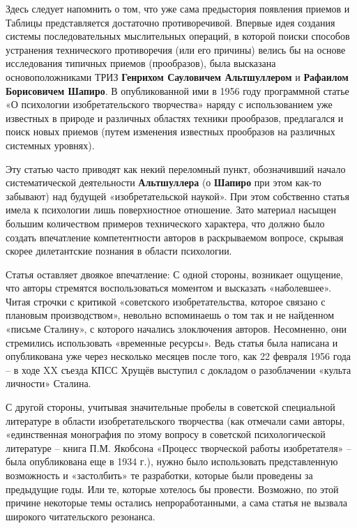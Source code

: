 \documentclass[11pt,a4paper]{article}
\begin{document}
Здесь следует напомнить о том, что уже сама предыстория появления приемов и
Таблицы представляется достаточно противоречивой. Впервые идея создания
системы последовательных мыслительных операций, в которой поиски способов
устранения технического противоречия (или его причины) велись бы на основе
исследования типичных приемов (прообразов), была высказана основоположниками
ТРИЗ \textbf{Генрихом Сауловичем Альтшуллером} и \textbf{Рафаилом Борисовичем
  Шапиро}. В опубликованной ими в 1956 году программной статье «О психологии
изобретательского творчества» \cite{Altshuller1956} наряду с использованием
уже известных в природе и различных областях техники прообразов, предлагался и
поиск новых приемов (путем изменения известных прообразов на различных
системных уровнях).

Эту статью часто приводят как некий переломный пункт, обозначивший начало
систематической деятельности \textbf{Альтшуллера} (о \textbf{Шапиро} при этом
как-то забывают) над будущей «изобретательской наукой». При этом собственно
статья имела к психологии лишь поверхностное отношение. Зато материал насыщен
большим количеством примеров технического характера, что должно было создать
впечатление компетентности авторов в раскрываемом вопросе, скрывая скорее
дилетантские познания в области психологии.

Статья оставляет двоякое впечатление: С одной стороны, возникает ощущение, что
авторы стремятся воспользоваться моментом и высказать «наболевшее». Читая
строчки с критикой «советского изобретательства, которое связано с плановым
производством», невольно вспоминаешь о том так и не найденном «письме
Сталину», с которого начались злоключения авторов. Несомненно, они стремились
использовать «временные ресурсы». Ведь статья была написана и опубликована уже
через несколько месяцев после того, как 22 февраля 1956 года -- в ходе XX
съезда КПСС Хрущёв выступил с докладом о разоблачении «культа личности»
Сталина.

С другой стороны, учитывая значительные пробелы в советской специальной
литературе в области изобретательского творчества (как отмечали сами авторы,
«единственная монография по этому вопросу в советской психологической
литературе -- книга П.М. Якобсона «Процесс творческой работы изобретателя»
\cite{Jacobson1934} -- была опубликована еще в 1934 г.), нужно было
использовать представленную возможность и «застолбить» те разработки, которые
были проведены за предыдущие годы. Или те, которые хотелось бы
провести. Возможно, по этой причине некоторые темы остались непроработанными,
а сама статья не вызвала широкого читательского резонанса.
\end{document}
